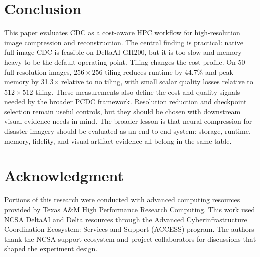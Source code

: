 \documentclass[conference]{IEEEtran}
\begin{document}
\section{Conclusion}

This paper evaluates CDC as a cost-aware HPC workflow for high-resolution image compression and reconstruction. The central finding is practical: native full-image CDC is feasible on DeltaAI GH200, but it is too slow and memory-heavy to be the default operating point. Tiling changes the cost profile. On 50 full-resolution images, $256 \times 256$ tiling reduces runtime by 44.7\% and peak memory by 31.3$\times$ relative to no tiling, with small scalar quality losses relative to $512 \times 512$ tiling. These measurements also define the cost and quality signals needed by the broader PCDC framework. Resolution reduction and checkpoint selection remain useful controls, but they should be chosen with downstream visual-evidence needs in mind. The broader lesson is that neural compression for disaster imagery should be evaluated as an end-to-end system: storage, runtime, memory, fidelity, and visual artifact evidence all belong in the same table.

\section*{Acknowledgment}

Portions of this research were conducted with advanced computing resources provided by Texas A\&M High Performance Research Computing. This work used NCSA DeltaAI and Delta resources through the Advanced Cyberinfrastructure Coordination Ecosystem: Services and Support (ACCESS) program. The authors thank the NCSA support ecosystem and project collaborators for discussions that shaped the experiment design.



\end{document}
